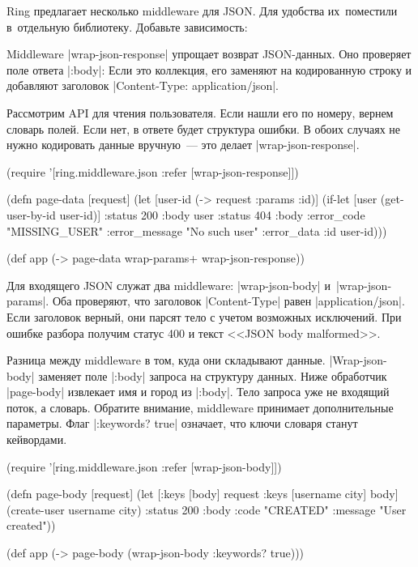 Ring предлагает несколько middleware для JSON. Для удобства их~поместили
в~отдельную библиотеку. Добавьте зависимость:

\begin{english}
  \begin{clojure}
  \end{clojure}
\end{english}

Middleware \spverb|wrap-json-response| упрощает возврат JSON-данных. Оно
проверяет поле ответа \spverb|:body|: Если это коллекция, его заменяют на
кодированную строку и добавляют заголовок \spverb|Content-Type: application/json|.

Рассмотрим API для чтения пользователя. Если нашли его по номеру, вернем словарь
полей. Если нет, в ответе будет структура ошибки. В обоих случаях не нужно
кодировать данные вручную~--- это делает \spverb|wrap-json-response|.

\begin{english}
  \begin{clojure}
(require '[ring.middleware.json
           :refer [wrap-json-response]])

(defn page-data [request]
  (let [user-id (-> request :params :id)]
    (if-let [user (get-user-by-id user-id)]
      {:status 200 :body user}
      {:status 404
       :body {:error_code "MISSING_USER"
              :error_message "No such user"
              :error_data {:id user-id}}})))

(def app (-> page-data
             wrap-params+
             wrap-json-response))
  \end{clojure}
\end{english}

Для входящего JSON служат два middleware: \spverb|wrap-json-body|
и~\spverb|wrap-json-params|. Оба проверяют, что заголовок \spverb|Content-Type|
равен \spverb|application/json|. Если заголовок верный, они парсят тело с учетом
возможных исключений. При ошибке разбора получим статус 400 и текст <<JSON body
malformed>>.

Разница между middleware в том, куда они складывают
данные. \spverb|Wrap-json-body| заменяет поле \spverb|:body| запроса на
структуру данных. Ниже обработчик \spverb|page-body| извлекает имя и город из
\spverb|:body|. Тело запроса уже не входящий поток, а словарь. Обратите
внимание, middleware принимает дополнительные параметры. Флаг \spverb|:keywords? true|
означает, что ключи словаря станут кейвордами.

\begin{english}
  \begin{clojure}
(require '[ring.middleware.json :refer [wrap-json-body]])

(defn page-body [request]
  (let [{:keys [body]} request
        {:keys [username city]} body]
    (create-user username city)
    {:status 200
     :body {:code "CREATED"
            :message "User created"}}))

(def app (-> page-body
             (wrap-json-body {:keywords? true})))
  \end{clojure}
\end{english}

